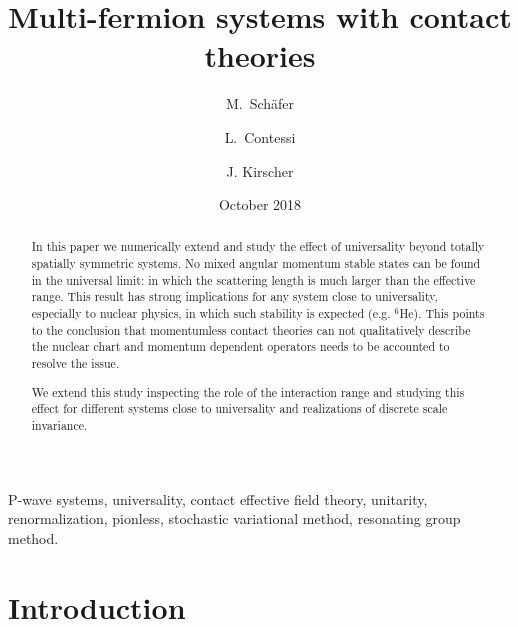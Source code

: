 \documentclass[preprint,12pt]{elsarticle}
\begin{document}
\begin{frontmatter}

\title{Multi-fermion systems with contact theories}
\author{M.~Sch{\"a}fer}
\address{Nuclear Physics Institute of the Czech Academy of Sciences, 25069 \v{R}e\v{z}, Czech Republic}
\address{Czech Technical University in Prague, Faculty of Nuclear Sciences and Physical Engineering, B\v{r}ehov\'{a} 7, 11519 Prague 1, Czech Republic}
\author{L.~Contessi} 
\address{Racah Institute of Physics, The Hebrew University, 91904 Jerusalem, 
Israel} 
\address{ESNT, IRFU, CEA, Universite Paris Saclay, F-91191 Gif-sur-Yvette, France} 
\author{J. Kirscher}
\address{Theoretical Physics Division, School of Physics and Astronomy,
The University of Manchester, Manchester, M13 9PL, United Kingdom} 
\date{October 2018}


\begin{abstract}
In this paper we numerically extend and study the effect of universality beyond totally spatially symmetric systems. 
No mixed angular momentum stable states can be found in the universal limit: in which the scattering length is much larger than the effective range.
This result has strong implications for any system close to universality, especially to nuclear physics, in which such stability is expected (e.g. $^6$He).
This points to the conclusion that momentumless contact theories can not qualitatively describe the nuclear chart and momentum dependent operators needs to be accounted to resolve the issue. 

We extend this study inspecting the role of the interaction range and studying this effect for different systems close to universality and realizations of discrete scale invariance.
\end{abstract}

\begin{keyword} 
P-wave systems, universality, contact effective field theory, unitarity, renormalization, pionless, stochastic variational method, resonating group method.
\end{keyword} 

\end{frontmatter}


\section{Introduction}
\end{document}
